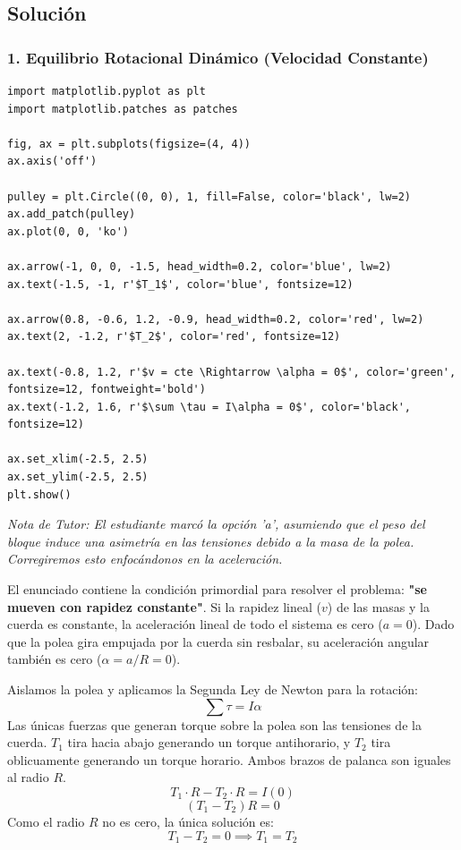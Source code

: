 \documentclass[12pt, a4paper]{article}
\begin{document}
\subsection*{Solución}

\subsubsection*{1. Equilibrio Rotacional Dinámico (Velocidad Constante)}

\begin{verbatim}
import matplotlib.pyplot as plt
import matplotlib.patches as patches

fig, ax = plt.subplots(figsize=(4, 4))
ax.axis('off')

pulley = plt.Circle((0, 0), 1, fill=False, color='black', lw=2)
ax.add_patch(pulley)
ax.plot(0, 0, 'ko')

ax.arrow(-1, 0, 0, -1.5, head_width=0.2, color='blue', lw=2)
ax.text(-1.5, -1, r'$T_1$', color='blue', fontsize=12)

ax.arrow(0.8, -0.6, 1.2, -0.9, head_width=0.2, color='red', lw=2)
ax.text(2, -1.2, r'$T_2$', color='red', fontsize=12)

ax.text(-0.8, 1.2, r'$v = cte \Rightarrow \alpha = 0$', color='green', fontsize=12, fontweight='bold')
ax.text(-1.2, 1.6, r'$\sum \tau = I\alpha = 0$', color='black', fontsize=12)

ax.set_xlim(-2.5, 2.5)
ax.set_ylim(-2.5, 2.5)
plt.show()
\end{verbatim}

\textit{Nota de Tutor: El estudiante marcó la opción 'a', asumiendo que el peso del bloque induce una asimetría en las tensiones debido a la masa de la polea. Corregiremos esto enfocándonos en la aceleración.}

El enunciado contiene la condición primordial para resolver el problema: \textbf{"se mueven con rapidez constante"}.
Si la rapidez lineal ($v$) de las masas y la cuerda es constante, la aceleración lineal de todo el sistema es cero ($a = 0$). 
Dado que la polea gira empujada por la cuerda sin resbalar, su aceleración angular también es cero ($\alpha = a/R = 0$).

Aislamos la polea y aplicamos la Segunda Ley de Newton para la rotación:
$$ \sum \tau = I \alpha $$
Las únicas fuerzas que generan torque sobre la polea son las tensiones de la cuerda. $T_1$ tira hacia abajo generando un torque antihorario, y $T_2$ tira oblicuamente generando un torque horario. Ambos brazos de palanca son iguales al radio $R$.
$$ T_1 \cdot R - T_2 \cdot R = I(0) $$
$$ (T_1 - T_2) R = 0 $$
Como el radio $R$ no es cero, la única solución es:
$$ T_1 - T_2 = 0 \implies T_1 = T_2 $$
\end{document}
